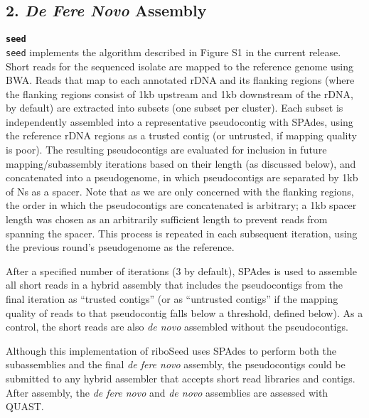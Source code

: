 \documentclass[a4,center,fleqn]{NAR}
\begin{document}
\subsection*{2. \textit{De Fere Novo} Assembly}

\textbf{\texttt{seed}}\\
\texttt{seed} implements the algorithm described in Figure S1 in the current release. Short reads for the sequenced isolate are mapped to the reference genome using BWA\cite{Li2009}. Reads that map to each annotated rDNA and its flanking regions (where the flanking regions consist of 1kb upstream and 1kb downstream of the rDNA, by default) are extracted into subsets (one subset per cluster). Each subset is independently assembled into a representative pseudocontig with SPAdes\cite{Bankevich2012}, using the reference rDNA regions as a trusted contig (or untrusted, if mapping quality is poor). The resulting pseudocontigs are evaluated for inclusion in future mapping/subassembly iterations based on their length (as discussed below), and concatenated into a pseudogenome, in which pseudocontigs are separated by 1kb of Ns as a spacer. Note that as we are only concerned with the flanking regions, the order in which the pseudocontigs are concatenated is arbitrary; a 1kb spacer length was chosen as an arbitrarily sufficient length to prevent reads from spanning the spacer. This process is repeated in each subsequent iteration, using the previous round's pseudogenome as the reference.


After a specified number of iterations (3 by default), SPAdes is used to assemble all short reads in a hybrid assembly that includes the pseudocontigs from the final iteration as ``trusted contigs'' (or as ``untrusted contigs'' if the mapping quality of reads to that pseudocontig falls below a threshold, defined below). As a control, the short reads are also \textit{de novo} assembled without the pseudocontigs.


Although this implementation of riboSeed uses SPAdes to perform both the subassemblies and the final \textit{de fere novo} assembly, the pseudocontigs could be submitted to any hybrid assembler that accepts short read libraries and contigs. After assembly, the \textit{de fere novo} and \textit{de novo} assemblies are assessed with QUAST\cite{Gurevich2013}.
\end{document}
